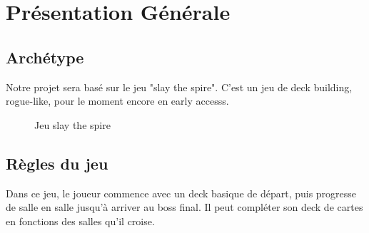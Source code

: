 \section{Présentation Générale}

\subsection{Archétype}

Notre projet sera basé sur le jeu "slay the spire". C'est un jeu de deck building, rogue-like, pour le moment encore en early accesss.



\begin{figure}[h]
\begin{center}
%
\qquad
{}%
\caption{\label{slaythespiregame}Jeu slay the spire}
\end{center}
\end{figure}

\subsection{Règles du jeu}

Dans ce jeu, le joueur commence avec un deck basique de départ, puis progresse de salle en salle jusqu'à arriver au boss final. Il peut compléter son deck de cartes en fonctions des salles qu'il croise.

